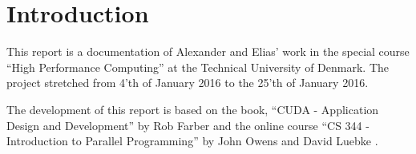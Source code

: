 \chapter{Introduction}
\label{chap:introduction}

This report is a documentation of Alexander and Elias' work in the special course ``High Performance Computing'' at the Technical University of Denmark.
The project stretched from 4'th of January 2016 to the 25'th of January 2016.

The development of this report is based on the book, ``CUDA - Application Design and Development'' by Rob Farber \cite{farber2011cuda} and the online course ``CS 344 - Introduction to Parallel Programming'' by John Owens and David Luebke \cite{udacity}.



